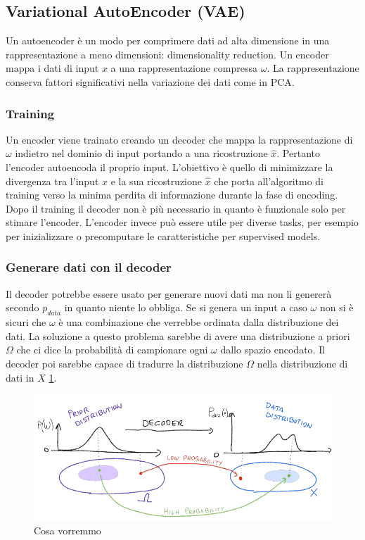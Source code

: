 	\subsection{Variational AutoEncoder (VAE)}
	Un autoencoder \`e un modo per comprimere dati ad alta dimensione in una rappresentazione a meno dimensioni: dimensionality reduction.
	Un encoder mappa i dati di input $x$ a una rappresentazione compressa $\omega$.
	La rappresentazione conserva fattori significativi nella variazione dei dati come in PCA.

		\subsubsection{Training}
		Un encoder viene trainato creando un decoder che mappa la rappresentazione di $\omega$ indietro nel dominio di input portando a una ricostruzione $\hat{x}$.
		Pertanto l'encoder autoencoda il proprio input.
		L'obiettivo \`e quello di minimizzare la divergenza tra l'input $x$ e la sua ricostruzione $\hat{x}$ che porta all'algoritmo di training verso la minima perdita di informazione durante la fase di encoding.
		Dopo il training il decoder non \`e pi\`u necessario in quanto \`e funzionale solo per stimare l'encoder.
		L'encoder invece pu\`o essere utile per diverse tasks, per esempio per inizializzare o precomputare le caratteristiche per supervised models.
		
		\subsubsection{Generare dati con il decoder}
		Il decoder potrebbe essere usato per generare nuovi dati ma non li generer\`a secondo $p_{data}$ in quanto niente lo obbliga.
		Se si genera un input a caso $\omega$ non si \`e sicuri che $\omega$ \`e una combinazione che verrebbe ordinata dalla distribuzione dei dati.
		La soluzione a questo problema sarebbe di avere una distribuzione a priori $\Omega$ che ci dice la probabilit\`a di campionare ogni $\omega$ dallo spazio encodato.
		Il decoder poi sarebbe capace di tradurre la distribuzione $\Omega$ nella distribuzione di dati in $X$ \ref{fig:chapter12-13}.
		\begin{figure}
			\centering
			\includegraphics[width=0.6\linewidth]{imgs/chapter12/img13}
			\caption{Cosa vorremmo}
			\label{fig:chapter12-13}
		\end{figure}
		
